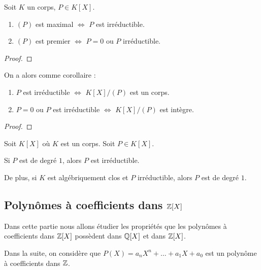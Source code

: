 \begin{proposition}
	Soit $K$ un corps, $P \in K[X]$.
	\begin{enumerate}
		\item $(P)$ est maximal $\Leftrightarrow$ $P$ est irréductible.
		\item $(P)$ est premier $\Leftrightarrow$ $P = 0$ ou $P$
			irréductible.
	\end{enumerate}
\end{proposition}

\begin{proof}
	
\end{proof}

On a alors comme corollaire :

\begin{corollary}
	\begin{enumerate}
		\item $P$ est irréductible $\Leftrightarrow$ $K[X]/(P)$ est un corps.
		\item $P = 0$ ou $P$ est irréductible $\Leftrightarrow$ $K[X]/(P)$ est
			intègre.
	\end{enumerate}
\end{corollary}

\begin{proof}
	
\end{proof}

\begin{proposition}
	Soit $K[X]$ où $K$ est un corps. Soit $P \in K[X]$.
	
	Si $P$ est de degré $1$, alors $P$ est irréductible.
	
	De plus, si $K$ est algébriquement clos et $P$ irréductible, alors $P$ est
	de degré $1$.
\end{proposition}
\subsection{Polynômes à coefficients dans $\mathbb{Z}[X]$}

Dans cette partie nous allons étudier les propriétés que les polynômes à
coefficients dans $\mathbb{Z}[X]$ possèdent dans $\mathbb{Q}[X]$ et dans
$\mathbb{Z}[X]$.


Dans la suite, on considère que $P(X) = a_{n}X^{n} + \ldots + a_{1}X + a_{0}$
est un polynôme à coefficients dans $\mathbb{Z}$.

